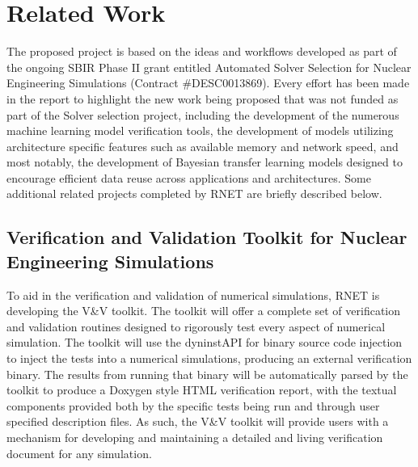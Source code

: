 
\section{Related Work}
\label{related}

The proposed project is based on the ideas and workflows developed as part of the ongoing SBIR Phase II grant entitled Automated Solver Selection for Nuclear Engineering Simulations (Contract \#DESC0013869). Every effort has been made in the report to highlight the new work being proposed that was not funded as part of the Solver selection project, including the development of the numerous machine learning model verification tools, the development of models utilizing architecture specific features such as available memory and network speed, and most notably, the development of Bayesian transfer learning models designed to encourage efficient data reuse across applications and architectures. Some additional related projects completed by RNET are briefly described below. 

\subsection{Verification and Validation Toolkit for Nuclear Engineering Simulations} 
To aid in the verification and validation of numerical simulations, RNET is developing the V\&V toolkit. The toolkit will offer a complete set of verification and validation routines designed to rigorously test every aspect of numerical simulation. The toolkit will use the dyninstAPI for binary source code injection to inject the tests into a numerical simulations, producing an external verification binary. The results from running that binary will be automatically parsed by the toolkit to produce a Doxygen style HTML verification report, with the textual components provided both by the specific tests being run and through user specified description files. As such, the V\&V toolkit will provide users with a mechanism for developing and maintaining a detailed and living verification document for any simulation.     


